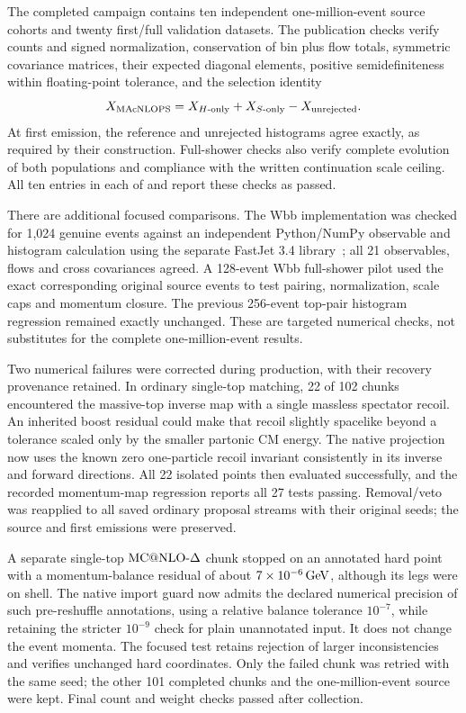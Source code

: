 The completed campaign contains ten independent one-million-event
source cohorts and twenty first/full validation datasets.  The
publication checks verify counts and signed normalization,
conservation of bin plus flow totals, symmetric covariance matrices,
their expected diagonal elements, positive semidefiniteness within
floating-point tolerance, and the selection identity
\begin{equation}
 X_{\rm MAcNLOPS}
 = X_{H\text{-only}}+X_{S\text{-only}}-X_{\rm unrejected}.
 \label{eq:impl-selection-identity}
\end{equation}
At first emission, the reference and unrejected histograms agree
exactly, as required by their construction.  Full-shower checks also
verify complete evolution of both populations and compliance with the
written continuation scale ceiling.  All ten entries in each of
 and
 report these checks as passed.

There are additional focused comparisons.  The Wbb implementation
was checked for 1,024 genuine events against an independent
Python/NumPy observable and histogram calculation using the separate
FastJet 3.4 library~\cite{FastJet,AntiKt}; all 21 observables, flows and
cross covariances agreed.  A 128-event Wbb full-shower pilot used the
exact corresponding original source events to test pairing,
normalization, scale caps and momentum closure.  The previous
256-event top-pair histogram regression remained exactly unchanged.
These are targeted numerical checks, not substitutes for the complete
one-million-event results.

Two numerical failures were corrected during production, with their
recovery provenance retained.  In ordinary single-top matching,
22 of 102 chunks encountered the massive-top inverse map with a single
massless spectator recoil.  An inherited boost residual could make
that recoil slightly spacelike beyond a tolerance scaled only by the
smaller partonic CM energy.  The native projection now uses the known
zero one-particle recoil invariant consistently in its inverse and
forward directions.  All 22 isolated points then evaluated
successfully, and the recorded momentum-map regression reports all
27 tests passing.  Removal/veto was reapplied to all saved ordinary
proposal streams with their original seeds; the source and first
emissions were preserved.

A separate single-top \(\text{MC@NLO-}\Delta\) chunk stopped on an annotated hard
point with a momentum-balance residual of about
\(7\times10^{-6}\,\mathrm{GeV}\), although its legs were on shell.  The native
import guard now admits the declared numerical precision of such
pre-reshuffle annotations, using a relative balance tolerance
\(10^{-7}\), while retaining the stricter \(10^{-9}\) check for plain
unannotated input.  It does not change the event momenta.  The focused
test retains rejection of larger inconsistencies and verifies
unchanged hard coordinates.  Only the failed chunk was retried with
the same seed; the other 101 completed chunks and the one-million-event
source were kept.  Final count and weight checks passed after collection.

